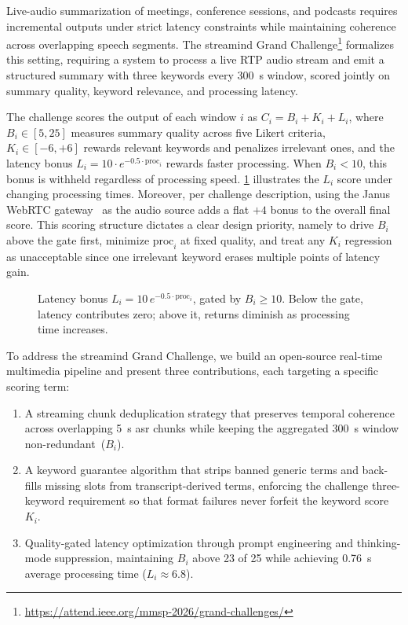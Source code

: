 \documentclass[conference,letterpaper]{IEEEtran}
\begin{document}
\glsresetall

Live-audio summarization of meetings, conference sessions, and podcasts requires incremental outputs under strict latency constraints while maintaining coherence across overlapping speech segments.
The \gls{streamind} Grand Challenge\footnote{\url{https://attend.ieee.org/mmsp-2026/grand-challenges/}} formalizes this setting, requiring a system to process a live RTP audio stream and emit a structured summary with three keywords every \SI{300}{\second} window, scored jointly on summary quality, keyword relevance, and processing latency.

The challenge scores the output of each window $i$ as $C_i = B_i + K_i + L_i$, where $B_i \in [5, 25]$ measures summary quality across five Likert criteria, $K_i \in [-6, +6]$ rewards relevant keywords and penalizes irrelevant ones, and the latency bonus $L_i = 10 \cdot e^{-0.5 \cdot \text{proc}_i}$ rewards faster processing.
When $B_i < \num{10}$, this bonus is withheld regardless of processing speed.
\cref{fig:scoring} illustrates the $L_i$ score under changing processing times.
Moreover, per challenge description, using the Janus WebRTC gateway~\cite{janus} as the audio source adds a flat $+4$ bonus to the overall final score.
This scoring structure dictates a clear design priority, namely to drive $B_i$ above the gate first, minimize $\text{proc}_i$ at fixed quality, and treat any $K_i$ regression as unacceptable since one irrelevant keyword erases multiple points of latency gain.

\begin{figure}[htb!]
    \centering
    
    \caption{Latency bonus $L_i = 10 \, e^{-0.5 \cdot \text{proc}_i}$, gated by $B_i \ge 10$. Below the gate, latency contributes zero; above it, returns diminish as processing time increases.}
    \label{fig:scoring}
\end{figure}

To address the \gls{streamind} Grand Challenge, we build an open-source real-time multimedia pipeline and present three contributions, each targeting a specific scoring term:
\begin{enumerate}[leftmargin=*, nosep]
    \item A streaming chunk deduplication strategy that preserves temporal coherence across overlapping \SI{5}{\second} \gls{asr} chunks while keeping the aggregated \SI{300}{\second} window non-redundant~($B_i$).
    \item A keyword guarantee algorithm that strips banned generic terms and back-fills missing slots from transcript-derived terms, enforcing the challenge three-keyword requirement so that format failures never forfeit the keyword score~$K_i$.
    \item Quality-gated latency optimization through prompt engineering and thinking-mode suppression, maintaining $B_i$ above \num{23} of \num{25} while achieving \SI{0.76}{\second} average processing time ($L_i \approx 6.8$).
\end{enumerate}
\end{document}
